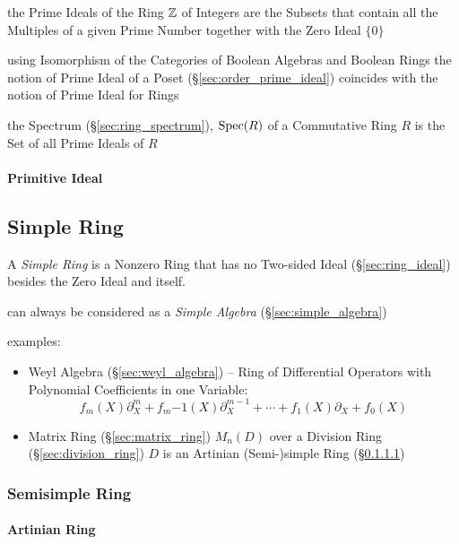 \begin{itemize}
the Prime Ideals of the Ring $\mathbb{Z}$ of Integers are the Subsets that contain
all the Multiples of a given Prime Number together with the Zero Ideal $\{0\}$

\fist using Isomorphism of the Categories of Boolean Algebras and Boolean Rings
the notion of Prime Ideal of a Poset (\S\ref{sec:order_prime_ideal}) coincides
with the notion of Prime Ideal for Rings

the Spectrum (\S\ref{sec:ring_spectrum}), $\mathrm{Spec}(R)$ of a Commutative Ring $R$
is the Set of all Prime Ideals of $R$



\paragraph{Primitive Ideal}\label{sec:primitive_ideal}\hfill



\subsection{Simple Ring}\label{sec:simple_ring}

A \emph{Simple Ring} is a Nonzero Ring that has no Two-sided Ideal
(\S\ref{sec:ring_ideal}) besides the Zero Ideal and itself.

can always be considered as a \emph{Simple Algebra} (\S\ref{sec:simple_algebra})

examples:
\begin{itemize}
  \item Weyl Algebra (\S\ref{sec:weyl_algebra}) -- Ring of Differential
    Operators with Polynomial Coefficients in one Variable:\[
      f_m(X)\partial^m_X + f_m{-1}(X)\partial^{m-1}_X + \cdots +
      f_1(X)\partial_X + f_0(X)
    \]
  \item Matrix Ring (\S\ref{sec:matrix_ring}) $M_n(D)$ over a Division Ring
    (\S\ref{sec:division_ring}) $D$ is an Artinian (Semi-)simple Ring
    (\S\ref{sec:artinian_ring})
\end{itemize}



\subsubsection{Semisimple Ring}\label{sec:semisimple_ring}

\paragraph{Artinian Ring}\label{sec:artinian_ring}\hfill


\end{itemize}
